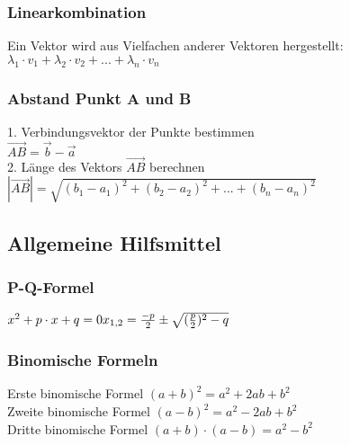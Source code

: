 \documentclass[6pt,a4paper]{scrartcl}
\newcommand{\abs}[1]{\ensuremath{\left\vert#1\right\vert}}
\begin{document}
\begin{multicols*}{3}
\subsubsection{Linearkombination}
Ein Vektor wird aus Vielfachen anderer Vektoren hergestellt:\\
${\lambda}_{1}\cdot v_1 + {\lambda}_{2}\cdot v_2 + ... + {\lambda}_{n} \cdot v_n$

\subsubsection{Abstand Punkt A und B}
1. Verbindungsvektor der Punkte bestimmen\\
$\overrightarrow{AB} = \overrightarrow{b} - \overrightarrow{a}$
\\
2. Länge des Vektors $\overrightarrow{AB}$ berechnen\\
$\abs{\overrightarrow{AB}} = \sqrt{(b_1-a_1)^2 + (b_2-a_2)^2 + ... + (b_n-a_n)^2}$\\
\subsection{Allgemeine Hilfsmittel}
\subsubsection{P-Q-Formel}
$
x^2 + p\cdot x + q = 0\\
{x}_{1,2} = \frac{-p}{2} \pm \sqrt{(\frac{p}{2})^2 - q}
$
\subsubsection{Binomische Formeln}
Erste binomische Formel $(a+b)^{2}=a^{2} + 2ab + b^{2}$ \\
Zweite binomische Formel $(a-b)^{2}=a^{2} - 2ab + b^{2}$ \\
Dritte binomische Formel $(a+b)\cdot (a-b)=a^{2}-b^{2}$ \\


\end{multicols*}
\end{document}
